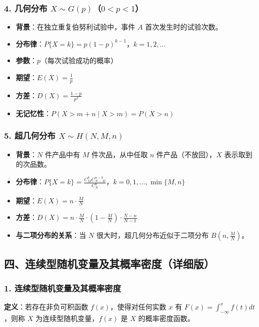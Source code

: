 \documentclass[12pt,a4paper]{ctexart}
\begin{document}
\subsubsection{4. 几何分布 $X \sim G(p)$（$0 < p < 1$）}
\begin{itemize}[noitemsep]
    \item \textbf{背景}：在独立重复伯努利试验中，事件 $A$ 首次发生时的试验次数。
    \item \textbf{分布律}：$P\{X = k\} = p(1-p)^{k-1}$，$k = 1,2,\dots$
    \item \textbf{参数}：$p$（每次试验成功的概率）
    \item \textbf{期望}：$E(X) = \frac{1}{p}$
    \item \textbf{方差}：$D(X) = \frac{1-p}{p^2}$
    \item \textbf{无记忆性}：$P(X > m+n \mid X > m) = P(X > n)$
\end{itemize}

\subsubsection{5. 超几何分布 $X \sim H(N, M, n)$}
\begin{itemize}[noitemsep]
    \item \textbf{背景}：$N$ 件产品中有 $M$ 件次品，从中任取 $n$ 件产品（不放回），$X$ 表示取到的次品数。
    \item \textbf{分布律}：$P\{X = k\} = \frac{C_M^k C_{N-M}^{n-k}}{C_N^n}$，$k = 0,1,\dots,\min\{M,n\}$
    \item \textbf{期望}：$E(X) = n \cdot \frac{M}{N}$
    \item \textbf{方差}：$D(X) = n \cdot \frac{M}{N} \cdot \left(1 - \frac{M}{N}\right) \cdot \frac{N-n}{N-1}$
    \item \textbf{与二项分布的关系}：当 $N$ 很大时，超几何分布近似于二项分布 $B(n, \frac{M}{N})$。
\end{itemize}

\subsection{四、连续型随机变量及其概率密度（详细版）}

\subsubsection{1. 连续型随机变量及其概率密度}
\textbf{定义}：若存在非负可积函数 $f(x)$，使得对任何实数 $x$ 有 $F(x) = \int_{-\infty}^x f(t) dt$，则称 $X$ 为连续型随机变量，$f(x)$ 是 $X$ 的概率密度函数。
\end{document}
